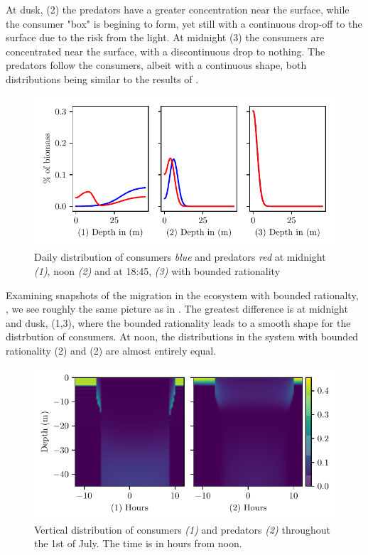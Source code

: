 At dusk, (2) the predators have a greater concentration near the surface, while the consumer "box" is begining to form, yet still with a continuous drop-off to the surface due to the risk from the light.
At midnight (3) the consumers are concentrated near the surface, with a discontinuous drop to nothing. The predators follow the consumers, albeit with a continuous shape, both distributions being similar to the results of \citep{verticalmigration}.
\begin{figure}[H]
\includegraphics{plots/specific_dists_semi_rational.pdf}
\caption{Daily distribution of consumers \emph{blue} and predators \emph{red} at midnight \emph{(1)}, noon \emph{(2)} and at 18:45, \emph{(3)} with bounded rationality}
\label{fig:specific_dists_semi_rational}
\end{figure}
Examining snapshots of the migration in the ecosystem with bounded rationalty, , we see roughly the same picture as in . The greatest difference is at midnight and dusk, (1,3), where the bounded rationality leads to a smooth shape for the distrbution of consumers. At noon, the distributions in the system with bounded rationality (2) and (2) are almost entirely equal.
\begin{figure}[H]
\includegraphics{plots/heatmapsday90_nonrandom.pdf}
\caption{Vertical distribution of consumers \emph{(1)} and predators \emph{(2)} throughout the 1st of July. The time is in hours from noon. }
\label{fig:heatmaps_90_nonrandom}
\end{figure}
